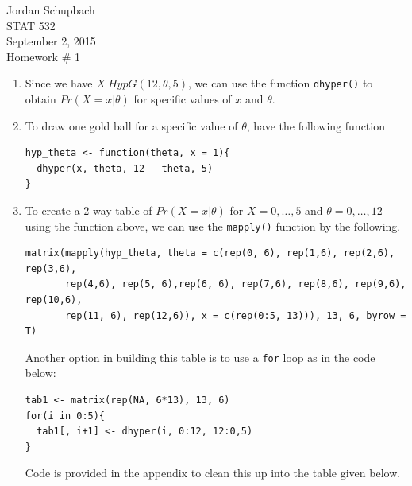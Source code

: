 \documentclass[12pt]{article}\usepackage[]{graphicx}\usepackage[]{color}
\begin{document}
{ \flushright Jordan Schupbach \\
STAT 532\\
September 2, 2015 \\}
Homework \# 1\\

\begin{enumerate}
\item Since we have $X ~HypG(12, \theta, 5)$, we can use the function \texttt{dhyper()} to obtain \newline $Pr(X=x| \theta)$ for specific values of $x$ and $\theta$.

\item To draw one gold ball for a specific value of $\theta$, have the following function
\begin{verbatim}
hyp_theta <- function(theta, x = 1){
  dhyper(x, theta, 12 - theta, 5)
}
\end{verbatim}
\item To create a 2-way table of $Pr(X=x | \theta)$ for $X=0, \dots, 5$ and $\theta = 0, \dots, 12$ using the function above, we can use the \texttt{mapply()} function by the following.

\begin{verbatim}
matrix(mapply(hyp_theta, theta = c(rep(0, 6), rep(1,6), rep(2,6), rep(3,6), 
       rep(4,6), rep(5, 6),rep(6, 6), rep(7,6), rep(8,6), rep(9,6), rep(10,6), 
       rep(11, 6), rep(12,6)), x = c(rep(0:5, 13))), 13, 6, byrow = T)
\end{verbatim}

Another option in building this table is to use a \texttt{for} loop as in the code below:

\begin{verbatim}
tab1 <- matrix(rep(NA, 6*13), 13, 6)
for(i in 0:5){
  tab1[, i+1] <- dhyper(i, 0:12, 12:0,5)
}
\end{verbatim}

\newpage 
Code is provided in the appendix to clean this up into the table given below.


\end{enumerate}
\end{document}
